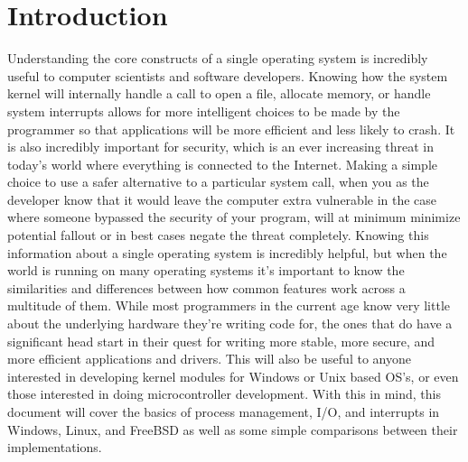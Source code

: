 \section{Introduction}
Understanding the core constructs of a single operating system is incredibly useful to computer scientists and software developers. Knowing how the system kernel will internally handle a call to open a file, allocate memory, or handle system interrupts allows for more intelligent choices to be made by the programmer so that applications will be more efficient and less likely to crash. It is also incredibly important for security, which is an ever increasing threat in today's world where everything is connected to the Internet. Making a simple choice to use a safer alternative to a particular system call, when you as the developer know that it would leave the computer extra vulnerable in the case where someone bypassed the security of your program, will at minimum minimize potential fallout or in best cases negate the threat completely. Knowing this information about a single operating system is incredibly helpful, but when the world is running on many operating systems it's important to know the similarities and differences between how common features work across a multitude of them. While most programmers in the current age know very little about the underlying hardware they're writing code for, the ones that do have a significant head start in their quest for writing more stable, more secure, and more efficient applications and drivers. This will also be useful to anyone interested in developing kernel modules for Windows or Unix based OS's, or even those interested in doing microcontroller development. With this in mind, this document will cover the basics of process management, I/O, and interrupts in Windows, Linux, and FreeBSD as well as some simple comparisons between their implementations.


